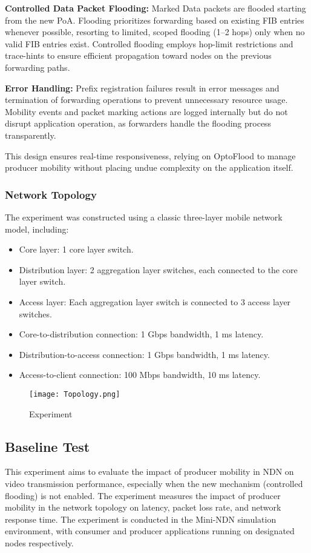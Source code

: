 \documentclass[conference]{IEEEtran}
\begin{document}
\textbf{Controlled Data Packet Flooding:}
Marked Data packets are flooded starting from the new PoA. Flooding prioritizes forwarding based on existing FIB entries whenever possible, resorting to limited, scoped flooding (1–2 hops) only when no valid FIB entries exist. Controlled flooding employs hop-limit restrictions and trace-hints to ensure efficient propagation toward nodes on the previous forwarding paths.

\textbf{Error Handling:}
Prefix registration failures result in error messages and termination of forwarding operations to prevent unnecessary resource usage. Mobility events and packet marking actions are logged internally but do not disrupt application operation, as forwarders handle the flooding process transparently.

This design ensures real-time responsiveness, relying on OptoFlood to manage producer mobility without placing undue complexity on the application itself.

\subsubsection{Network Topology}
The experiment was constructed using a classic three-layer mobile network model, including:
\begin{itemize}
    \item Core layer: 1 core layer switch.
    \item Distribution layer: 2 aggregation layer switches, each connected to the core layer switch.
    \item Access layer: Each aggregation layer switch is connected to 3 access layer switches.
    \item Core-to-distribution connection: 1 Gbps bandwidth, 1 ms latency.
    \item Distribution-to-access connection: 1 Gbps bandwidth, 1 ms latency.
    \item Access-to-client connection: 100 Mbps bandwidth, 10 ms latency.
\end{itemize}

\begin{figure}
    \centering
    \texttt{[image: Topology.png]}
    \caption{Experiment}
    \label{fig:enter-label}
\end{figure}

\subsection{Baseline Test}
This experiment aims to evaluate the impact of producer mobility in NDN on video transmission performance, especially when the new mechanism (controlled flooding) is not enabled. The experiment measures the impact of producer mobility in the network topology on latency, packet loss rate, and network response time. The experiment is conducted in the Mini-NDN simulation environment, with consumer and producer applications running on designated nodes respectively.
\end{document}
